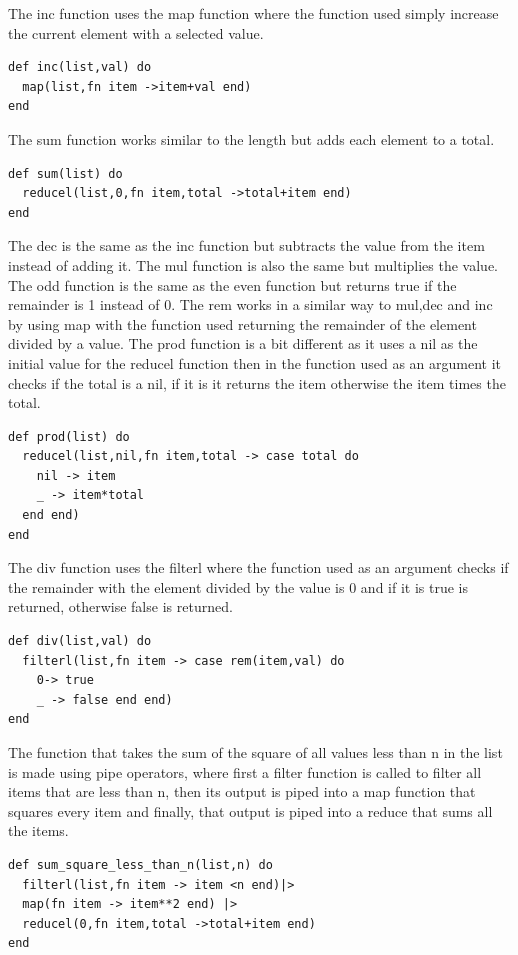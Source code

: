 \documentclass[a4paper,11pt]{article}
\begin{document}
The inc function uses the map function where the function used simply increase the current element with a selected value.
\begin{verbatim}
def inc(list,val) do
  map(list,fn item ->item+val end)
end
\end{verbatim}

The sum function works similar to the length but adds each element to a total. 
\begin{verbatim}
def sum(list) do
  reducel(list,0,fn item,total ->total+item end)
end
\end{verbatim}

The dec is the same as the inc function but subtracts the value from the item instead of adding it. 
The mul function is also the same but multiplies the value. The odd function is the same as the even function but 
returns true if the remainder is 1 instead of 0. The rem works in a similar way to mul,dec and inc by using map with the function used returning the remainder of the element divided by a value. 
The prod function is a bit different as it uses a nil as the initial value for the reducel function then in the function used as an argument it checks if the total is a nil, if it is it returns the item otherwise the item times the total. 
\begin{verbatim}
def prod(list) do
  reducel(list,nil,fn item,total -> case total do
    nil -> item
    _ -> item*total
  end end)
end
\end{verbatim}
The div function uses the filterl where the function used as an argument checks if the remainder with the element divided by the value is 0 and if it is true is returned, 
otherwise false is returned.
\begin{verbatim}
def div(list,val) do
  filterl(list,fn item -> case rem(item,val) do
    0-> true
    _ -> false end end)
end
\end{verbatim}
The function that takes the sum of the square of all values less than n in the list is made using pipe operators, where first a filter function is called to filter all items that are less than n, then its output is piped into a map function that squares every item and finally, 
that output is piped into a reduce that sums all the items.
\begin{verbatim}
def sum_square_less_than_n(list,n) do
  filterl(list,fn item -> item <n end)|> 
  map(fn item -> item**2 end) |> 
  reducel(0,fn item,total ->total+item end)
end
\end{verbatim}
\end{document}
